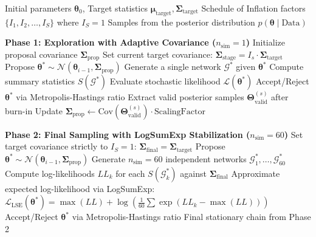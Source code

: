 \begin{algorithm}[H]
\caption{Hybrid Two-Stage Adaptive MCMC for Model 1 (Stochastic Evaluation)}
\begin{algorithmic}[1]
\Require Initial parameters $\boldsymbol{\theta}_0$, Target statistics $\boldsymbol{\mu}_{\text{target}}, \boldsymbol{\Sigma}_{\text{target}}$
\Require Schedule of Inflation factors $\{I_1, I_2, \dots, I_S\}$ where $I_S = 1$
\Ensure Samples from the posterior distribution $p(\boldsymbol{\theta} \mid \text{Data})$

\Statex \textbf{Phase 1: Exploration with Adaptive Covariance ($n_{\text{sim}} = 1$)}
\State Initialize proposal covariance $\boldsymbol{\Sigma}_{\text{prop}}$
    \State Set current target covariance: $\boldsymbol{\Sigma}_{\text{stage}} = I_s \cdot \boldsymbol{\Sigma}_{\text{target}}$
        \State Propose $\boldsymbol{\theta}^* \sim \mathcal{N}(\boldsymbol{\theta}_{i-1}, \boldsymbol{\Sigma}_{\text{prop}})$
        \State Generate a single network $\mathcal{G}^*$ given $\boldsymbol{\theta}^*$
        \State Compute summary statistics $S(\mathcal{G}^*)$
        \State Evaluate stochastic likelihood $\mathcal{L}(\boldsymbol{\theta}^*)$
        \State Accept/Reject $\boldsymbol{\theta}^*$ via Metropolis-Hastings ratio
    \EndFor
    \State Extract valid posterior samples $\boldsymbol{\Theta}_{\text{valid}}^{(s)}$ after burn-in
    \State Update $\boldsymbol{\Sigma}_{\text{prop}} \gets \mathrm{Cov}(\boldsymbol{\Theta}_{\text{valid}}^{(s)}) \cdot \text{ScalingFactor}$
\EndFor

\Statex \textbf{Phase 2: Final Sampling with LogSumExp Stabilization ($n_{\text{sim}} = 60$)}
\State Set target covariance strictly to $I_S = 1$: $\boldsymbol{\Sigma}_{\text{final}} = \boldsymbol{\Sigma}_{\text{target}}$
    \State Propose $\boldsymbol{\theta}^* \sim \mathcal{N}(\boldsymbol{\theta}_{i-1}, \boldsymbol{\Sigma}_{\text{prop}})$
    \State Generate $n_{\text{sim}}=60$ independent networks $\mathcal{G}^*_1, \dots, \mathcal{G}^*_{60}$
    \State Compute log-likelihoods $LL_k$ for each $S(\mathcal{G}^*_k)$ against $\boldsymbol{\Sigma}_{\text{final}}$
    \State Approximate expected log-likelihood via LogSumExp: $\mathcal{L}_{\text{LSE}}(\boldsymbol{\theta}^*) = \max(LL) + \log \left( \frac{1}{60} \sum \exp(LL_k - \max(LL)) \right)$
    \State Accept/Reject $\boldsymbol{\theta}^*$ via Metropolis-Hastings ratio
\EndFor
\State \Return Final stationary chain from Phase 2
\end{algorithmic}
\end{algorithm}



